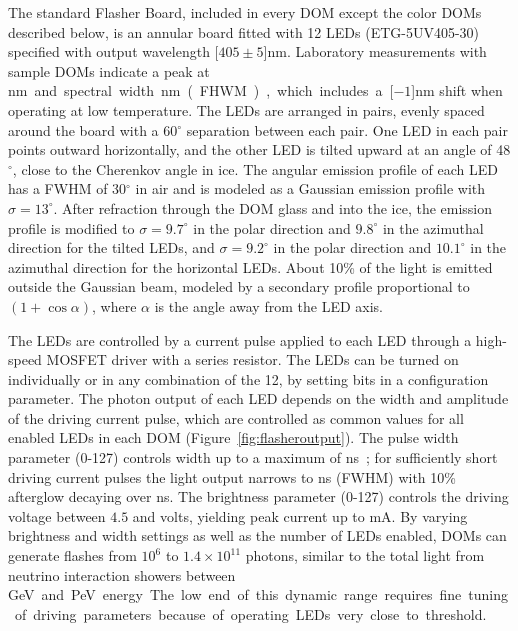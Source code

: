 The standard Flasher Board, included in every DOM except the color DOMs
described below, is an annular board fitted with 12 LEDs (ETG-5UV405-30)
specified with output wavelength \unit[$405\pm5$]nm.  Laboratory
measurements with sample DOMs indicate a peak at
\unit[399]nm and spectral width \unit[14]nm (FHWM), which includes a
\unit[$-1$]nm shift when operating at low temperature.
The LEDs are arranged in pairs, evenly spaced around the board
with a 60$^{\circ}$ separation between each pair. One LED in each pair
points outward horizontally, and the other LED is tilted upward at an angle
of 48$^{\circ}$, close to the Cherenkov angle in ice.
The angular emission profile of each LED has a FWHM of
30$^{\circ}$ in air and is modeled as a Gaussian emission profile
with $\sigma = 13^{\circ}$. After refraction through the DOM glass and into
the ice, the emission profile is modified to $\sigma = 9.7^{\circ}$ in the polar direction
and $9.8^{\circ}$ in the azimuthal direction for the tilted LEDs, and $\sigma=9.2^{\circ}$ in the polar direction
and $10.1^{\circ}$ in the azimuthal direction for the horizontal LEDs.
About 10\% of the light is emitted outside the Gaussian beam, modeled by
a secondary profile proportional to $(1+\cos{\alpha})$, where $\alpha$ is the angle
away from the LED axis.

The LEDs are controlled by a current pulse applied to each LED through
a high-speed MOSFET driver with a series resistor. The LEDs can be turned on individually or in any
combination of the 12, by setting bits in a configuration parameter.
The photon output of each LED depends on the width and
amplitude of the driving current pulse, which are controlled as common
values for all enabled LEDs in each DOM (Figure~\ref{fig:flasheroutput}).  
The pulse width parameter (0-127) controls width up to a maximum of \unit[70]{ns}~\cite{ICECUBE:SPICE}; 
for sufficiently short driving current pulses the light output narrows to \unit[6]{ns} (FWHM) with
10\% afterglow decaying over \unit[15--20]{ns}.
The brightness parameter (0-127) controls the driving voltage between $4.5$ and \unit[15]{volts}, yielding
peak current up to \unit[300]{mA}.
By varying brightness and width settings as well as the number of LEDs enabled, DOMs can generate flashes
from $10^6$ to $1.4\times10^{11}$ photons, similar to the total light from
neutrino interaction showers between \unit[7]GeV and \unit[1]PeV energy.
The low end of this dynamic range requires fine tuning of driving parameters because of
operating LEDs very close to threshold.

